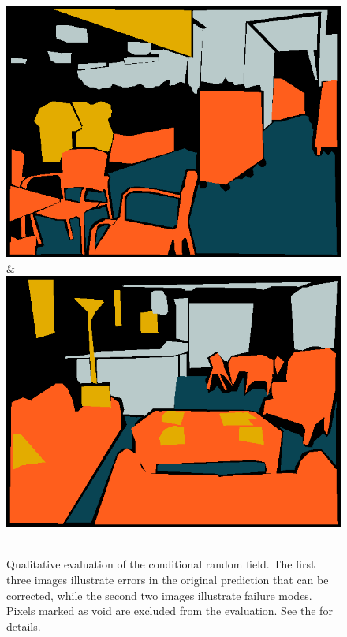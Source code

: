 \documentclass[a4paper, 10pt, conference]{ieeeconf}      %
\begin{document}
\begin{figure}
\begin{tabu}
    \includegraphics[width=\linewidth]{images/00118_gt.png}&%
    \includegraphics[width=\linewidth]{images/01203_gt.png}\\
    \vspace{3mm}\\
    \end{tabu}
\caption{%
Qualitative evaluation of the conditional random field.
The first three images illustrate errors in the original prediction that can be corrected, while
the second two images illustrate failure modes. Pixels marked as void
are excluded from the evaluation. See the  for details.
}
\end{figure}
\end{document}
